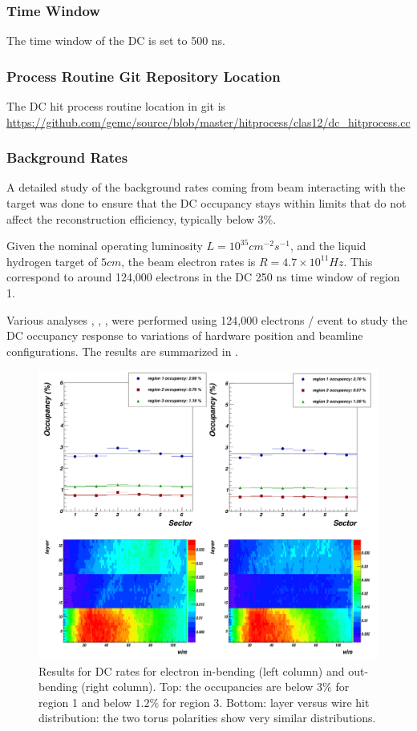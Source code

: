 \subsubsection{Time Window}

The time window  of the DC is set to 500 ns.

\subsubsection{Process Routine Git Repository Location}
The DC hit process routine location in git is \url{https://github.com/gemc/source/blob/master/hitprocess/clas12/dc_hitprocess.cc}


\subsubsection{Background Rates}

A detailed study of the background rates coming from beam interacting with the target was done to ensure that the DC occupancy stays
within limits that do not affect the reconstruction efficiency, typically below $3\%$.

Given the nominal operating luminosity $L=10^{35} cm^{-2}s^{-1}$, and the liquid hydrogen target of $5 cm$, the beam electron rates
is $R=4.7 \times 10^{11} Hz$. This correspond to around 124,000 electrons in the DC 250 ns time window of region 1.

Various analyses \cite{targetStudy}, \cite{clas12Beamline}, \cite{clas12Background}, were performed using 124,000 electrons / event
to study the DC occupancy response to variations of hardware position and beamline configurations.
The results are summarized in .

\begin{figure}
	\centering
	\includegraphics[width=0.95\columnwidth,keepaspectratio]{img/dcOccupancy.png}
	\caption{Results for DC rates for electron in-bending (left column) and out-bending (right column).
				Top: the occupancies are below $3\%$ for region 1 and below $1.2\%$ for region 3. Bottom: layer
				versus wire hit distribution: the two torus polarities show very similar distributions.}
	\label{fig:dcOccupancy}
\end{figure}

